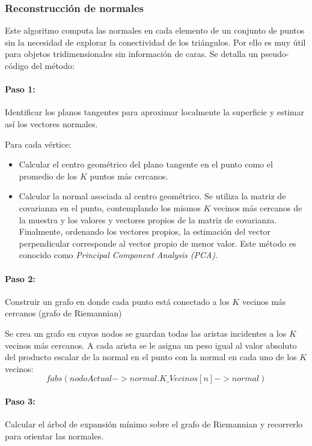 \subsubsection{Reconstrucción de normales}

Este algoritmo computa las normales en cada elemento de un conjunto de puntos sin la necesidad de explorar la conectividad de los triángulos. Por ello es muy útil para objetos tridimensionales sin información de caras.
Se detalla un pseudo-código del método:

\paragraph{Paso 1: }Identificar los planos tangentes para aproximar localmente la superficie y estimar así los vectores normales.


Para cada vértice:
  \begin{itemize}
    \item Calcular el centro geométrico del plano tangente en el punto como el promedio de los $K$ puntos más cercanos.
    \item Calcular la normal asociada al centro geométrico. Se utiliza la matriz de covarianza en el punto, contemplando los mismos $K$ vecinos más cercanos de la muestra y los valores y vectores propios de la matriz de covarianza. Finalmente, ordenando los vectores propios, la estimación del vector perpendicular corresponde al vector propio de menor valor. Este método es conocido como \emph{Principal Component Analysis (PCA)}.
  \end{itemize}

\paragraph{Paso 2: }Construir un grafo en donde cada punto está conectado a los $K$ vecinos más cercanos (grafo de Riemannian)


Se crea un grafo en cuyos nodos se guardan todas las aristas incidentes a los $K$ vecinos más cercanos. A cada arista se le asigna un peso igual al valor absoluto del producto escalar de la normal en el punto con la normal en cada uno de los $K$ vecinos:
   $$fabs(nodoActual->normal . K\_Vecinos[n]->normal)$$
\paragraph{Paso 3: }Calcular el árbol de expansión mínimo sobre el grafo de Riemannian y recorrerlo para orientar las normales.


